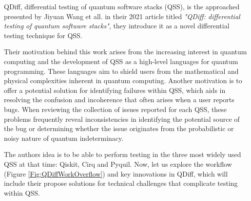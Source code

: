 QDiff, differential testing of quantum software stacks (QSS), is the approached presented by Jiyuan Wang et all. in their 2021 article titled \textit{"QDiff: differential testing of quantum software stacks"}\cite{wang2021qdiff}, they introduce it as a novel differential testing technique for QSS.\newline

Their motivation behind this work arises from the increasing interest in quantum computing and the development of QSS as a high-level languages for quantum programming. These languages aim to shield users from the mathematical and physical complexities inherent in quantum computing. Another motivation is to offer a potential solution for identifying failures within QSS, which aids in resolving the confusion and incoherence that often arises when a user reports bugs. When reviewing the collection of issues reported for each QSS, these problems frequently reveal inconsistencies in identifying the potential source of the bug or determining whether the issue originates from the probabilistic or noisy nature of quantum indeterminacy. \newline

The authors idea is to be able to perform testing in the three most widely used QSS \cite{larose2019overview} at that time: Qiskit, Cirq and Pyquil. Now, let us explore the workflow (Figure \ref{Fig:QDiffWorkOverflow}) and key innovations in  QDiff, which will include their propose solutions for technical challenges that complicate testing within QSS.

